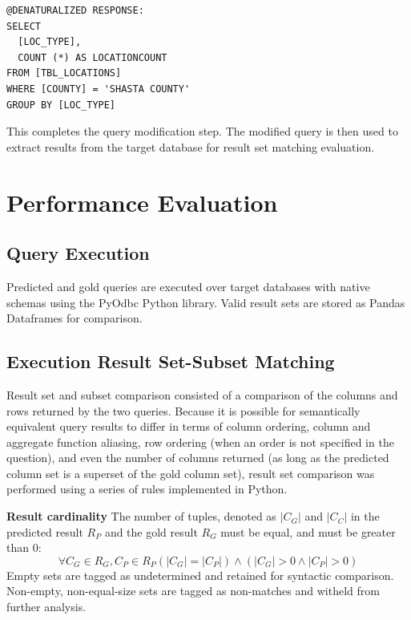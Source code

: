 \begin{verbatim}
@DENATURALIZED RESPONSE:
SELECT 
  [LOC_TYPE], 
  COUNT (*) AS LOCATIONCOUNT 
FROM [TBL_LOCATIONS] 
WHERE [COUNTY] = 'SHASTA COUNTY' 
GROUP BY [LOC_TYPE]   
\end{verbatim}

This completes the query modification step.
The modified query is then used to extract results from the target database for result set matching evaluation.




\section{Performance Evaluation}


\subsection{Query Execution}

Predicted and gold queries are executed over target databases with native schemas using the PyOdbc Python library.
Valid result sets are stored as Pandas Dataframes for comparison.

\subsection{Execution Result Set-Subset Matching}

Result set and subset comparison consisted of a comparison of the columns and rows returned by the two queries. Because it is possible for semantically equivalent query results to differ in terms of column ordering, column and aggregate function aliasing, row ordering (when an order is not specified in the question), and even the number of columns returned (as long as the predicted column set is a superset of the gold column set), result set comparison was performed using a series of rules implemented in Python.

\textbf{Result cardinality} The number of tuples, denoted as $|C_G|$ and $|C_C|$ in the predicted result $R_P$ and the gold result $R_G$ must be equal, and must be greater than 0:
$$\forall C_G \in R_G, C_P \in R_P \left(|C_G| = |C_P|\right) \land (|C_G| > 0 \land |C_P| > 0)$$
Empty sets are tagged as undetermined and retained for syntactic comparison. Non-empty, non-equal-size sets are tagged as non-matches and witheld from further analysis.


